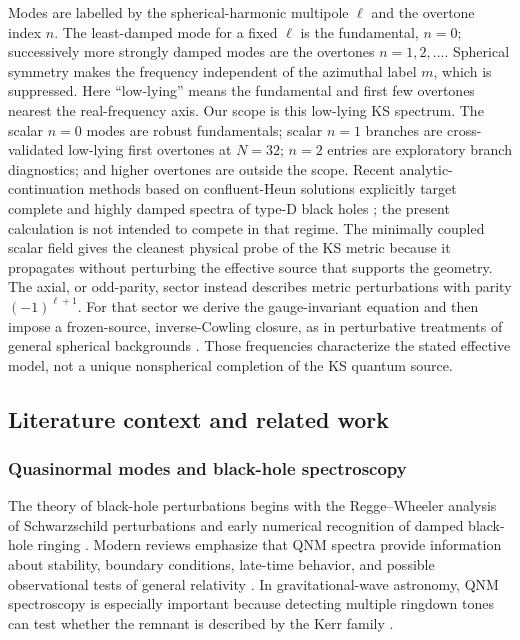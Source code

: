 \documentclass[12pt,a4paper]{article}
\begin{document}
Modes are labelled by the spherical-harmonic multipole \(\ell\) and the
overtone index \(n\).  The least-damped mode for a fixed \(\ell\) is the
fundamental, \(n=0\); successively more strongly damped modes are the
overtones \(n=1,2,\ldots\).  Spherical symmetry makes the frequency independent
of the azimuthal label \(m\), which is suppressed.  Here ``low-lying'' means
the fundamental and first few overtones nearest the real-frequency axis.  Our
scope is this low-lying KS spectrum. The
scalar \(n=0\) modes are robust fundamentals; scalar \(n=1\)
branches are cross-validated low-lying first overtones at \(N=32\); \(n=2\) entries are exploratory
branch diagnostics; and higher overtones are outside the scope.  Recent
analytic-continuation methods based on confluent-Heun solutions explicitly
target complete and highly damped spectra of type-D black holes
\cite{Chen2025}; the present calculation is not intended to compete in that
regime. The minimally coupled scalar field gives the cleanest physical probe
of the KS metric because it propagates without perturbing the effective source
that supports the geometry.  The axial, or odd-parity, sector instead
describes metric perturbations with parity \((-1)^{\ell+1}\).  For that sector
we derive the gauge-invariant equation and then impose a frozen-source,
inverse-Cowling closure,
as in perturbative treatments of general spherical backgrounds
\cite{Gerlach1979,Gundlach1999,Karlovini2002}. Those frequencies characterize
the stated effective model, not a unique nonspherical completion of the KS
quantum source.

\subsection{Literature context and related work}

\subsubsection{Quasinormal modes and black-hole spectroscopy}

The theory of black-hole perturbations begins with the Regge--Wheeler analysis of Schwarzschild perturbations \cite{Regge1957} and early numerical recognition of damped black-hole ringing \cite{Vishveshwara1970}. Modern reviews emphasize that QNM spectra provide information about stability, boundary conditions, late-time behavior, and possible observational tests of general relativity \cite{Kokkotas1999,Berti2009,Konoplya2011}. In gravitational-wave astronomy, QNM spectroscopy is especially important because detecting multiple ringdown tones can test whether the remnant is described by the Kerr family \cite{Berti2006,Isi2019}.
\end{document}

